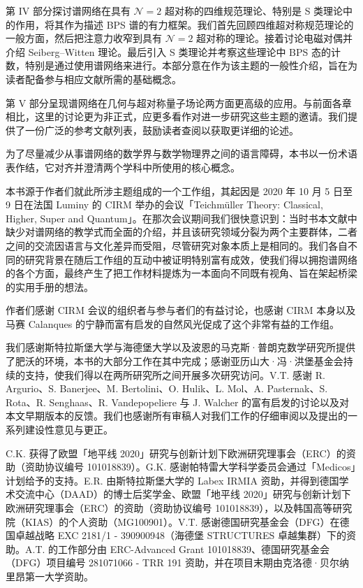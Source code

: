 第 IV 部分探讨谱网络在具有 $\mathcal N=2$ 超对称的四维规范理论、特别是 S 类理论中的作用，将其作为描述 BPS 谱的有力框架。我们首先回顾四维超对称规范理论的一般方面，然后把注意力收窄到具有 $\mathcal N=2$ 超对称的理论。接着讨论电磁对偶并介绍 Seiberg–Witten 理论。最后引入 S 类理论并考察这些理论中 BPS 态的计数，特别是通过使用谱网络来进行。本部分意在作为该主题的一般性介绍，旨在为读者配备参与相应文献所需的基础概念。

第 V 部分呈现谱网络在几何与超对称量子场论两方面更高级的应用。与前面各章相比，这里的讨论更为非正式，应更多看作对进一步研究这些主题的邀请。我们提供了一份广泛的参考文献列表，鼓励读者查阅以获取更详细的论述。

为了尽量减少从事谱网络的数学界与数学物理界之间的语言障碍，本书以一份术语表作结，它对齐并澄清两个学科中所使用的核心概念。

本书源于作者们就此所涉主题组成的一个工作组，其起因是 2020 年 10 月 5 日至 9 日在法国 Luminy 的 CIRM 举办的会议「Teichmüller Theory: Classical, Higher, Super and Quantum」。在那次会议期间我们很快意识到：当时书本文献中缺少对谱网络的教学式而全面的介绍，并且该研究领域分裂为两个主要群体，二者之间的交流因语言与文化差异而受阻，尽管研究对象本质上是相同的。我们各自不同的研究背景在随后工作组的互动中被证明特别富有成效，使我们得以拥抱谱网络的各个方面，最终产生了把工作材料提炼为一本面向不同既有视角、旨在架起桥梁的实用手册的想法。

作者们感谢 CIRM 会议的组织者与参与者们的有益讨论，也感谢 CIRM 本身以及马赛 Calanques 的宁静而富有启发的自然风光促成了这个非常有益的工作组。


我们感谢斯特拉斯堡大学与海德堡大学以及波恩的马克斯·普朗克数学研究所提供了肥沃的环境，本书的大部分工作在其中完成；感谢亚历山大·冯·洪堡基金会持续的支持，使我们得以在两所研究所之间开展多次研究访问。V.T. 感谢 R. Argurio、S. Banerjee、M. Bertolini、O. Hulik、L. Mol、A. Pasternak、S. Rota、R. Senghaas、R. Vandepopeliere 与 J. Walcher 的富有启发的讨论以及对本文早期版本的反馈。我们也感谢所有审稿人对我们工作的仔细审阅以及提出的一系列建设性意见与更正。

C.K. 获得了欧盟「地平线 2020」研究与创新计划下欧洲研究理事会（ERC）的资助（资助协议编号 101018839）。G.K. 感谢帕特雷大学科学委员会通过「Medicos」计划给予的支持。E.R. 由斯特拉斯堡大学的 Labex IRMIA 资助，并得到德国学术交流中心（DAAD）的博士后奖学金、欧盟「地平线 2020」研究与创新计划下欧洲研究理事会（ERC）的资助（资助协议编号 101018839），以及韩国高等研究院（KIAS）的个人资助（MG100901）。V.T. 感谢德国研究基金会（DFG）在德国卓越战略 EXC 2181/1 - 390900948（海德堡 STRUCTURES 卓越集群）下的资助。A.T. 的工作部分由 ERC-Advanced Grant 101018839、德国研究基金会（DFG）项目编号 281071066 - TRR 191 资助，并在项目末期由克洛德·贝尔纳里昂第一大学资助。

